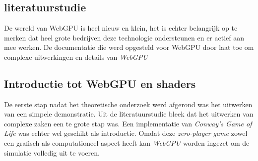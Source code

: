 
\chapter{}%
\label{ch:methodologie}


\section{literatuurstudie}

De wereld van WebGPU is heel nieuw en klein, het is echter belangrijk op te merken dat heel grote bedrijven deze technologie ondersteunen en er actief aan mee werken. De documentatie die werd opgesteld voor WebGPU door \textcite{W3C2023} laat toe om complexe uitwerkingen en details van \textit{WebGPU}

\section{Introductie tot WebGPU en shaders}

De eerste stap nadat het theoretische onderzoek werd afgerond was het uitwerken van een simpele demonstratie. Uit de literatuurstudie bleek dat het uitwerken van complexe zaken een te grote stap was. Een implementatie van \textit{Conway's Game of Life} was echter wel geschikt als introductie. Omdat deze 
\textit{zero-player game} zowel een grafisch als computationeel aspect heeft kan \textit{WebGPU} worden ingezet om de simulatie volledig uit te voeren. \autocite{google2023}


